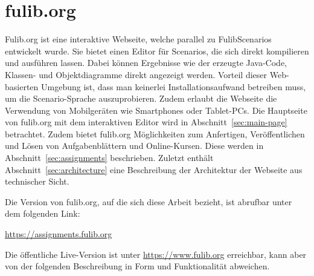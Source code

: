 \chapter{fulib.org}\label{ch:fulib.org}

Fulib.org ist eine interaktive Webseite, welche parallel zu FulibScenarios entwickelt wurde.
Sie bietet einen Editor für Scenarios, die sich direkt kompilieren und ausführen lassen.
Dabei können Ergebnisse wie der erzeugte Java-Code, Klassen- und Objektdiagramme direkt angezeigt werden.
Vorteil dieser Web-basierten Umgebung ist, dass man keinerlei Installationsaufwand betreiben muss, um die Scenario-Sprache auszuprobieren.
Zudem erlaubt die Webseite die Verwendung von Mobilgeräten wie Smartphones oder Tablet-PCs\@.
Die Hauptseite von fulib.org mit dem interaktiven Editor wird in Abschnitt~\ref{sec:main-page} betrachtet.
Zudem bietet fulib.org Möglichkeiten zum Anfertigen, Veröffentlichen und Lösen von Aufgabenblättern und Online-Kursen.
Diese werden in Abschnitt~\ref{sec:assignments} beschrieben.
Zuletzt enthält Abschnitt~\ref{sec:architecture} eine Beschreibung der Architektur der Webseite aus technischer Sicht.

Die Version von fulib.org, auf die sich diese Arbeit bezieht, ist abrufbar unter dem folgenden Link:

\begin{center}
    \url{https://assignments.fulib.org}
\end{center}

Die öffentliche Live-Version ist unter \url{https://www.fulib.org} erreichbar, kann aber von der folgenden Beschreibung in Form und Funktionalität abweichen.




